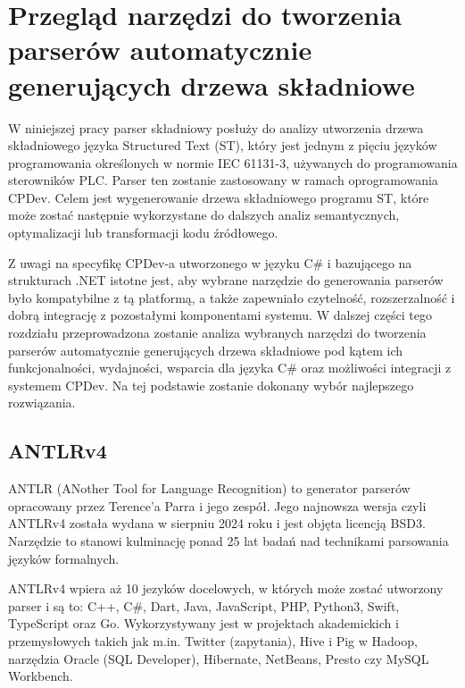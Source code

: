 \documentclass[12pt,twoside]{article}
\begin{document}
\section{Przegląd narzędzi do tworzenia parserów automatycznie generujących drzewa składniowe}

W niniejszej pracy parser składniowy posłuży do analizy utworzenia drzewa składniowego języka Structured Text (ST), który jest jednym z pięciu języków programowania określonych w normie IEC 61131-3, używanych do programowania sterowników PLC. Parser ten zostanie zastosowany w ramach oprogramowania CPDev. Celem jest wygenerowanie drzewa składniowego programu ST, które może zostać następnie wykorzystane do dalszych analiz semantycznych, optymalizacji lub transformacji kodu źródłowego.

Z uwagi na specyfikę CPDev-a utworzonego w języku C\# i bazującego na strukturach .NET istotne jest, aby wybrane narzędzie do generowania parserów było kompatybilne z tą platformą, a także zapewniało czytelność, rozszerzalność i dobrą integrację z pozostałymi komponentami systemu. W dalszej części tego rozdziału przeprowadzona zostanie analiza wybranych narzędzi do tworzenia parserów automatycznie generujących drzewa składniowe pod kątem ich funkcjonalności, wydajności, wsparcia dla języka C\# oraz możliwości integracji z systemem CPDev. Na tej podstawie zostanie dokonany wybór najlepszego rozwiązania.
\subsection{ANTLRv4}

ANTLR (ANother Tool for Language Recognition) to generator parserów opracowany przez Terence'a Parra i jego zespół. Jego najnowsza wersja czyli ANTLRv4 została wydana w sierpniu 2024 roku i jest objęta licencją BSD3. Narzędzie to stanowi kulminację ponad 25 lat badań nad technikami parsowania języków formalnych. 

ANTLRv4 wpiera aż 10 jezyków docelowych\cite{antlr4GitHub}, w których może zostać utworzony parser i są to: C++, C\#, Dart, Java, JavaScript, PHP, Python3, Swift, TypeScript oraz Go. Wykorzystywany jest w projektach akademickich i przemysłowych takich jak m.in. Twitter (zapytania), Hive i Pig w Hadoop, narzędzia Oracle (SQL Developer), Hibernate, NetBeans, Presto czy MySQL Workbench.\cite{antlr4Org}
\end{document}
